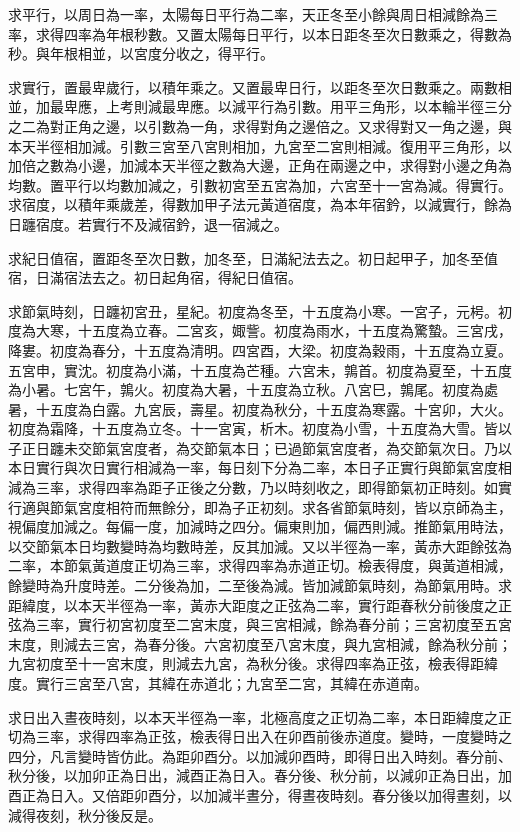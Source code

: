\begin{pinyinscope}
求平行，以周日為一率，太陽每日平行為二率，天正冬至小餘與周日相減餘為三率，求得四率為年根秒數。又置太陽每日平行，以本日距冬至次日數乘之，得數為秒。與年根相並，以宮度分收之，得平行。

求實行，置最卑歲行，以積年乘之。又置最卑日行，以距冬至次日數乘之。兩數相並，加最卑應，上考則減最卑應。以減平行為引數。用平三角形，以本輪半徑三分之二為對正角之邊，以引數為一角，求得對角之邊倍之。又求得對又一角之邊，與本天半徑相加減。引數三宮至八宮則相加，九宮至二宮則相減。復用平三角形，以加倍之數為小邊，加減本天半徑之數為大邊，正角在兩邊之中，求得對小邊之角為均數。置平行以均數加減之，引數初宮至五宮為加，六宮至十一宮為減。得實行。求宿度，以積年乘歲差，得數加甲子法元黃道宿度，為本年宿鈐，以減實行，餘為日躔宿度。若實行不及減宿鈐，退一宿減之。

求紀日值宿，置距冬至次日數，加冬至，日滿紀法去之。初日起甲子，加冬至值宿，日滿宿法去之。初日起角宿，得紀日值宿。

求節氣時刻，日躔初宮丑，星紀。初度為冬至，十五度為小寒。一宮子，元枵。初度為大寒，十五度為立春。二宮亥，娵訾。初度為雨水，十五度為驚蟄。三宮戌，降婁。初度為春分，十五度為清明。四宮酉，大梁。初度為穀雨，十五度為立夏。五宮申，實沈。初度為小滿，十五度為芒種。六宮未，鶉首。初度為夏至，十五度為小暑。七宮午，鶉火。初度為大暑，十五度為立秋。八宮巳，鶉尾。初度為處暑，十五度為白露。九宮辰，壽星。初度為秋分，十五度為寒露。十宮卯，大火。初度為霜降，十五度為立冬。十一宮寅，析木。初度為小雪，十五度為大雪。皆以子正日躔未交節氣宮度者，為交節氣本日；已過節氣宮度者，為交節氣次日。乃以本日實行與次日實行相減為一率，每日刻下分為二率，本日子正實行與節氣宮度相減為三率，求得四率為距子正後之分數，乃以時刻收之，即得節氣初正時刻。如實行適與節氣宮度相符而無餘分，即為子正初刻。求各省節氣時刻，皆以京師為主，視偏度加減之。每偏一度，加減時之四分。偏東則加，偏西則減。推節氣用時法，以交節氣本日均數變時為均數時差，反其加減。又以半徑為一率，黃赤大距餘弦為二率，本節氣黃道度正切為三率，求得四率為赤道正切。檢表得度，與黃道相減，餘變時為升度時差。二分後為加，二至後為減。皆加減節氣時刻，為節氣用時。求距緯度，以本天半徑為一率，黃赤大距度之正弦為二率，實行距春秋分前後度之正弦為三率，實行初宮初度至二宮末度，與三宮相減，餘為春分前；三宮初度至五宮末度，則減去三宮，為春分後。六宮初度至八宮末度，與九宮相減，餘為秋分前；九宮初度至十一宮末度，則減去九宮，為秋分後。求得四率為正弦，檢表得距緯度。實行三宮至八宮，其緯在赤道北；九宮至二宮，其緯在赤道南。

求日出入晝夜時刻，以本天半徑為一率，北極高度之正切為二率，本日距緯度之正切為三率，求得四率為正弦，檢表得日出入在卯酉前後赤道度。變時，一度變時之四分，凡言變時皆仿此。為距卯酉分。以加減卯酉時，即得日出入時刻。春分前、秋分後，以加卯正為日出，減酉正為日入。春分後、秋分前，以減卯正為日出，加酉正為日入。又倍距卯酉分，以加減半晝分，得晝夜時刻。春分後以加得晝刻，以減得夜刻，秋分後反是。


\end{pinyinscope}
